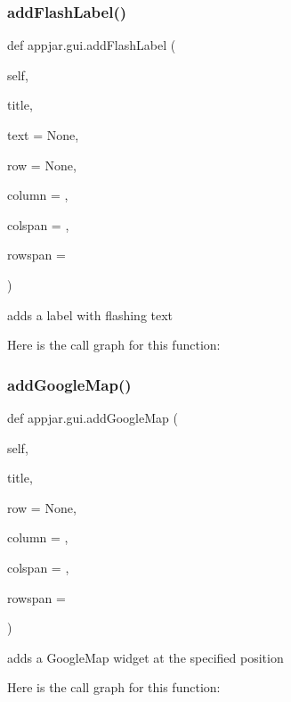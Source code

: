 \subsubsection{\texorpdfstring{add\+Flash\+Label()}{addFlashLabel()}}
{\footnotesize\ttfamily def appjar.\+gui.\+add\+Flash\+Label (\begin{DoxyParamCaption}\item[{}]{self,  }\item[{}]{title,  }\item[{}]{text = {\ttfamily None},  }\item[{}]{row = {\ttfamily None},  }\item[{}]{column = {},  }\item[{}]{colspan = {},  }\item[{}]{rowspan = {} }\end{DoxyParamCaption})}

\begin{DoxyVerb}adds a label with flashing text \end{DoxyVerb}
 Here is the call graph for this function\+:
\mbox{\label{classappjar_1_1gui_a2441a7d64981fd4552d1530661f53547}} 
\subsubsection{\texorpdfstring{add\+Google\+Map()}{addGoogleMap()}}
{\footnotesize\ttfamily def appjar.\+gui.\+add\+Google\+Map (\begin{DoxyParamCaption}\item[{}]{self,  }\item[{}]{title,  }\item[{}]{row = {\ttfamily None},  }\item[{}]{column = {},  }\item[{}]{colspan = {},  }\item[{}]{rowspan = {} }\end{DoxyParamCaption})}

\begin{DoxyVerb}adds a GoogleMap widget at the specified position \end{DoxyVerb}
 Here is the call graph for this function\+:
\mbox{\label{classappjar_1_1gui_a0e25170d6d4d38fd911d2b67bd7a3177}} 
